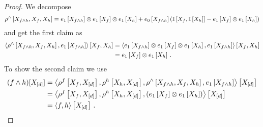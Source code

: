 \begin{proof}
	We decompose 
	\begin{align*}
		\rho^{\land}\left[X_{f\land h},X_{f},X_{h}\right]
		= e_{1}\left[X_{f\land h}\right] \otimes e_{1}\left[X_{f}\right] \otimes e_{1}\left[X_{h}\right]
		+ e_{0}\left[X_{f\land h}\right] \left( \mathbb{I}\left[X_{f},\mathbb{I}\left[X_{h}\right]\right] -  e_{1}\left[X_{f}\right] \otimes e_{1}\left[X_{h}\right] \right) 
	\end{align*}
	and get the first claim as
	\begin{align*}
		\left\langle 
			\rho^{\land}\left[X_{f\land h},X_{f},X_{h}\right],e_{1}\left[X_{f\land h}\right]
		\right\rangle \left[ X_{f},X_{h} \right]
		& = \left\langle 
			e_{1}\left[X_{f\land h}\right] \otimes e_{1}\left[X_{f}\right] \otimes e_{1}\left[X_{h}\right],e_{1}\left[X_{f\land h}\right]
		\right\rangle \left[ X_{f},X_{h} \right] \\
		& = e_{1}\left[X_{f}\right] \otimes e_{1}\left[X_{h}\right] \, . 
	\end{align*}
	To show the second claim we use
	\begin{align*}
		(f\land h)[X_{[d]}] 
		&= \left\langle 
			\rho^{f}\left[X_{f},X_{[d]}\right],
			\rho^{h}\left[X_{h},X_{[d]}\right],
			\rho^{\land}\left[X_{f\land h},X_{f},X_{h}\right],
			e_{1}\left[X_{f\land h}\right]
			\right\rangle \left[ X_{[d]} \right] \\
		&  = \left\langle 
			\rho^{f}\left[X_{f},X_{[d]}\right],
			\rho^{h}\left[X_{h},X_{[d]}\right],
			(e_{1}\left[X_{f}\right]\otimes e_{1}\left[X_{h}\right])
			\right\rangle \left[ X_{[d]} \right] \\
		&= \left\langle f,h\right\rangle \left[ X_{[d]} \right] \, . 
	\end{align*}
\end{proof}

